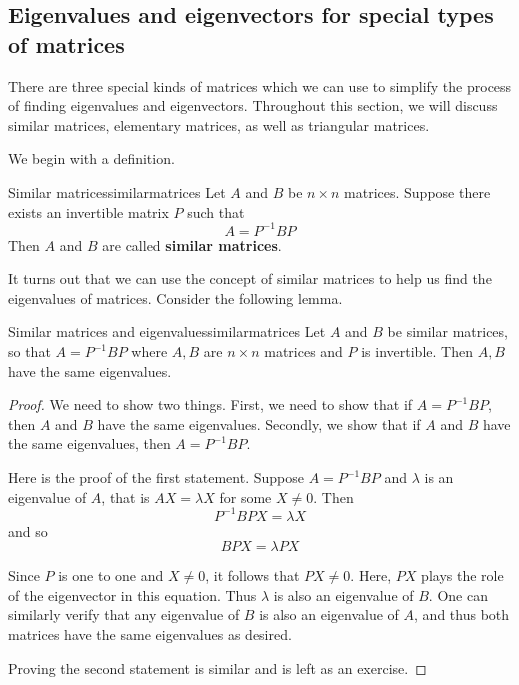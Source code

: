\subsection{Eigenvalues and eigenvectors for special types of matrices}

There are three special kinds of matrices which we can use to simplify the process of finding eigenvalues and eigenvectors. 
Throughout this section, we will discuss similar matrices, elementary matrices, as well as triangular matrices. 

We begin with a definition.

\begin{definition}{Similar matrices}{similarmatrices}
Let $A$ and $B$ be $n \times n$ matrices. Suppose there exists an invertible matrix $P$ such that 
\begin{equation*}
A = P^{-1}BP
\end{equation*}
Then $A$ and $B$ are called \textbf{similar matrices}.
\end{definition}

It turns out that we can use the concept of similar matrices to help us find the eigenvalues
of matrices. Consider the following lemma.

\begin{lemma}{Similar matrices and eigenvalues}{similarmatrices}
Let $A$ and $B$ be similar matrices, so that $A=P^{-1}BP$ where $A,B$ are $n\times n$ matrices and $P$ is invertible. Then $A,B$ have the
same eigenvalues.
\end{lemma}

\begin{proof}
We need to show two things. First, we need to show that if
$A=P^{-1}BP$, then $A$ and $B$ have the same eigenvalues.  Secondly,
we show that if $A$ and $B$ have the same eigenvalues, then
$A=P^{-1}BP$.

Here is the proof of the first statement. 
Suppose $A = P^{-1}BP$ and $\lambda$ is an eigenvalue of $A$, that is $AX=\lambda X$ for some $X\neq 0.$ Then
\begin{equation*}
P^{-1}BPX=\lambda X
\end{equation*}
and so
\begin{equation*}
BPX=\lambda PX
\end{equation*}

Since $P$ is one to one and $X \neq 0$, it follows that $PX \neq
0$. Here, $PX$ plays the role of the eigenvector in this equation.
Thus $\lambda$ is also an eigenvalue of $B$. One can similarly verify
that any eigenvalue of $B$ is also an eigenvalue of $A$, and thus both
matrices have the same eigenvalues as desired.

Proving the second statement is similar and is left as an exercise. 
\end{proof}

